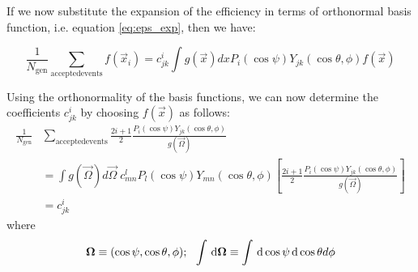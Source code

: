 If we now substitute the expansion of the efficiency in terms of orthonormal basis function, i.e.
equation \ref{eq:eps_exp}, then we have:

\begin{equation}
  \frac{1}{N_{\mathrm{gen}}} \sum_{\mathrm{accepted events}} f(\vec{x}_i)
    = c^i_{jk}  \int g(\vec{x})dx P_i(\cos\psi)Y_{jk}(\cos\theta,\phi)  f(\vec{x})
\end{equation}

Using the orthonormality of the basis functions, we can now determine the coefficients $c^i_{jk}$ 
by choosing $f(\vec{x})$ as follows:
\begin{align}
\frac{1}{N_{\mathrm{gen}}} &\sum_{\mathrm{accepted events}}
  \frac{2i+1}{2}\frac{ P_i(\cos\psi)Y_{jk}(\cos\theta,\phi) }{ g(\vec{\Omega}) } \\
  &= \int g(\vec{\Omega})d\vec{\Omega}\; c^l_{mn} P_l(\cos\psi)Y_{mn}(\cos\theta,\phi)
    \left[\frac{2i+1}{2}\frac{P_i(\cos\psi)Y_{jk}(\cos\theta,\phi)}{g(\vec{\Omega})}\right] \\
  &= c^i_{jk}
\end{align}
where
\begin{equation}
  \vec{\Omega} \equiv (\cos\psi,\cos\theta,\phi);\ \
    \int \ud\vec{\Omega} \equiv \int \ud\cos\psi \ud\cos\theta d\phi
\end{equation}

